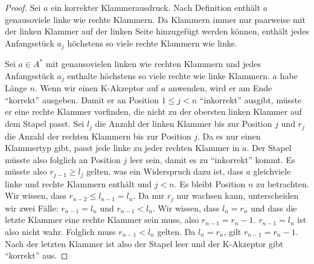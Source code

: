 \documentclass[a4paper,10pt]{article}
\begin{document}
\begin{proof}
 Sei $a$ ein korrekter Klammerausdruck.
 Nach Definition enthält $a$ genausoviele linke wie rechte Klammern.
 Da Klammern immer nur paarweise mit der linken Klammer auf der linken Seite hinzugefügt werden können, enthält jedes Anfangsstück $a_j$ höchstens so viele rechte Klammern wie linke.
 
 Sei $a \in A^*$ mit genausovielen linken wie rechten Klammern und jedes Anfangsstück $a_j$ enthalte höchstens so viele rechte wie linke Klammern.
 $a$ habe Länge $n$.
 Wenn wir einen K-Akzeptor auf $a$ anwenden, wird er am Ende ``korrekt'' ausgeben.
 Damit er an Position $1 \le j < n$ ``inkorrekt'' ausgibt, müsste er eine rechte Klammer vorfinden, die nicht zu der obersten linken Klammer auf dem Stapel passt.
 Sei $l_j$ die Anzahl der linken Klammer bis zur Position $j$ und $r_j$ die Anzahl der rechten Klammern bis zur Position $j$.
 Da es nur einen Klammertyp gibt, passt jede linke zu jeder rechten Klammer in $a$.
 Der Stapel müsste also folglich an Position $j$ leer sein, damit es zu ``inkorrekt'' kommt.
 Es müsste also $r_{j - 1} \ge l_j$ gelten, was ein Widerspruch dazu ist, dass $a$ gleichviele linke und rechte Klammern enthält und $j < n$.
 Es bleibt Position $n$ zu betrachten.
 Wir wissen, dass $r_{n - 2} \le l_{n - 1} = l_n$.
 Da nur $r_j$ nur wachsen kann, unterscheiden wir zwei Fälle: $r_{n - 1} = l_n$ und $r_{n - 1} < l_n$.
 Wir wissen, dass $l_n = r_n$ und dass die letzte Klammer eine rechte Klammer sein muss, also $r_{n - 1} = r_n - 1$.
 $r_{n - 1} = l_n$ ist also nicht wahr.
 Folglich muss $r_{n - 1} < l_n$ gelten.
 Da $l_n = r_n$, gilt $r_{n - 1} = r_n - 1$.
 Nach der letzten Klammer ist also der Stapel leer und der K-Akzeptor gibt ``korrekt'' aus.
\end{proof}
\end{document}
